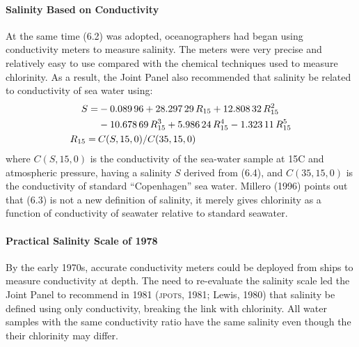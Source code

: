 \paragraph{Salinity Based on Conductivity} At the same time (6.2) was adopted, ocean\-ographers had began using conductivity meters to measure salinity. The meters were very precise and relatively easy to use compared with the chemical techniques used to measure chlorinity. As a result, the Joint Panel also recommended that salinity be related to conductivity of sea water using:
\begin{subequations}
\begin{align}
S  = &-0.089\,96 + 28.297\,29\,R_{15} + 12.808\,32\,R^2_{15} \notag \\
&-10.678\,69\,R^3_{15} + 5.986\,24\,R^4_{15} - 1.323\,11\,R^5_{15} \\
R_{15} = \: &C(S,15,0)/C(35,15,0)
\end{align}
\end{subequations}
where $C(S, 15, 0)$ is the conductivity of the sea-water sample at 15\degrees C and atmospheric pressure, having a salinity $S$ derived from (6.4), and $C(35, 15, 0)$ is the conductivity of standard ``Copenhagen'' sea water. Millero (1996) points out that (6.3) is not a new definition of salinity, it merely gives chlorinity as a function of conductivity of seawater relative to standard seawater.

\paragraph{Practical Salinity Scale of 1978} By the early 1970s, accurate conductivity meters could be deployed from ships to measure conductivity at depth. The need to re-evaluate the salinity scale led the Joint Panel to recommend in 1981 (\textsc{jpots}, 1981; Lewis, 1980) that salinity be defined using only conductivity, breaking the link with chlorinity. All water samples with the same conductivity ratio have the same salinity even though the their chlorinity may differ.

